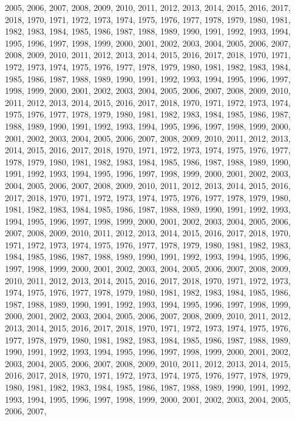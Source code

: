 \documentclass[
]{article}
\begin{document}
2005, 2006, 2007, 2008, 2009, 2010, 2011, 2012, 2013, 2014, 2015, 2016,
2017, 2018, 1970, 1971, 1972, 1973, 1974, 1975, 1976, 1977, 1978, 1979,
1980, 1981, 1982, 1983, 1984, 1985, 1986, 1987, 1988, 1989, 1990, 1991,
1992, 1993, 1994, 1995, 1996, 1997, 1998, 1999, 2000, 2001, 2002, 2003,
2004, 2005, 2006, 2007, 2008, 2009, 2010, 2011, 2012, 2013, 2014, 2015,
2016, 2017, 2018, 1970, 1971, 1972, 1973, 1974, 1975, 1976, 1977, 1978,
1979, 1980, 1981, 1982, 1983, 1984, 1985, 1986, 1987, 1988, 1989, 1990,
1991, 1992, 1993, 1994, 1995, 1996, 1997, 1998, 1999, 2000, 2001, 2002,
2003, 2004, 2005, 2006, 2007, 2008, 2009, 2010, 2011, 2012, 2013, 2014,
2015, 2016, 2017, 2018, 1970, 1971, 1972, 1973, 1974, 1975, 1976, 1977,
1978, 1979, 1980, 1981, 1982, 1983, 1984, 1985, 1986, 1987, 1988, 1989,
1990, 1991, 1992, 1993, 1994, 1995, 1996, 1997, 1998, 1999, 2000, 2001,
2002, 2003, 2004, 2005, 2006, 2007, 2008, 2009, 2010, 2011, 2012, 2013,
2014, 2015, 2016, 2017, 2018, 1970, 1971, 1972, 1973, 1974, 1975, 1976,
1977, 1978, 1979, 1980, 1981, 1982, 1983, 1984, 1985, 1986, 1987, 1988,
1989, 1990, 1991, 1992, 1993, 1994, 1995, 1996, 1997, 1998, 1999, 2000,
2001, 2002, 2003, 2004, 2005, 2006, 2007, 2008, 2009, 2010, 2011, 2012,
2013, 2014, 2015, 2016, 2017, 2018, 1970, 1971, 1972, 1973, 1974, 1975,
1976, 1977, 1978, 1979, 1980, 1981, 1982, 1983, 1984, 1985, 1986, 1987,
1988, 1989, 1990, 1991, 1992, 1993, 1994, 1995, 1996, 1997, 1998, 1999,
2000, 2001, 2002, 2003, 2004, 2005, 2006, 2007, 2008, 2009, 2010, 2011,
2012, 2013, 2014, 2015, 2016, 2017, 2018, 1970, 1971, 1972, 1973, 1974,
1975, 1976, 1977, 1978, 1979, 1980, 1981, 1982, 1983, 1984, 1985, 1986,
1987, 1988, 1989, 1990, 1991, 1992, 1993, 1994, 1995, 1996, 1997, 1998,
1999, 2000, 2001, 2002, 2003, 2004, 2005, 2006, 2007, 2008, 2009, 2010,
2011, 2012, 2013, 2014, 2015, 2016, 2017, 2018, 1970, 1971, 1972, 1973,
1974, 1975, 1976, 1977, 1978, 1979, 1980, 1981, 1982, 1983, 1984, 1985,
1986, 1987, 1988, 1989, 1990, 1991, 1992, 1993, 1994, 1995, 1996, 1997,
1998, 1999, 2000, 2001, 2002, 2003, 2004, 2005, 2006, 2007, 2008, 2009,
2010, 2011, 2012, 2013, 2014, 2015, 2016, 2017, 2018, 1970, 1971, 1972,
1973, 1974, 1975, 1976, 1977, 1978, 1979, 1980, 1981, 1982, 1983, 1984,
1985, 1986, 1987, 1988, 1989, 1990, 1991, 1992, 1993, 1994, 1995, 1996,
1997, 1998, 1999, 2000, 2001, 2002, 2003, 2004, 2005, 2006, 2007, 2008,
2009, 2010, 2011, 2012, 2013, 2014, 2015, 2016, 2017, 2018, 1970, 1971,
1972, 1973, 1974, 1975, 1976, 1977, 1978, 1979, 1980, 1981, 1982, 1983,
1984, 1985, 1986, 1987, 1988, 1989, 1990, 1991, 1992, 1993, 1994, 1995,
1996, 1997, 1998, 1999, 2000, 2001, 2002, 2003, 2004, 2005, 2006, 2007,
\end{document}

